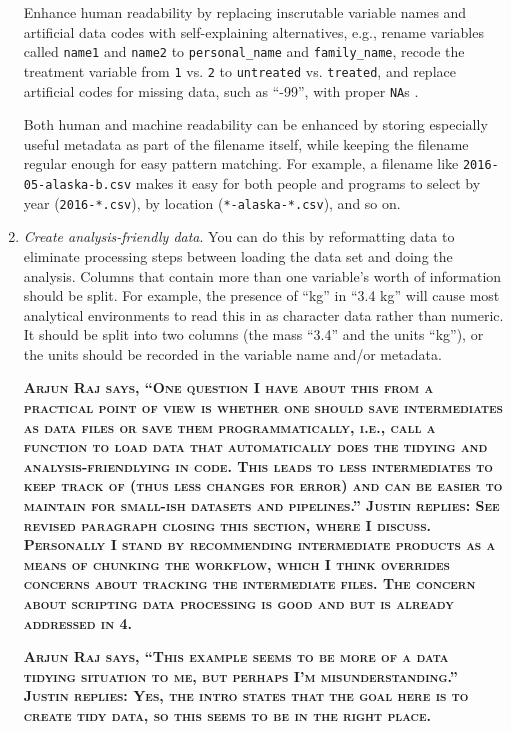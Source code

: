 \documentclass[10pt]{article}
\newcommand{\fixme}[1]{\textsc{\textbf{#1}}}
\newcommand{\recommend}[1]{\textit{#1}}
\begin{document}
\begin{enumerate}
  Enhance
  human readability by replacing inscrutable variable names and
  artificial data codes with self-explaining alternatives, e.g.,
  rename variables called \texttt{name1} and \texttt{name2} to
  \texttt{personal\_name} and \texttt{family\_name}, recode the
  treatment variable from \texttt{1} vs.  \texttt{2} to
  \texttt{untreated} vs. \texttt{treated}, and replace artificial
  codes for missing data, such as ``-99'', with proper \texttt{NA}s
  \cite{white2013}.

  Both human and machine readability can be enhanced by storing
  especially useful metadata as part of the filename itself, while
  keeping the filename regular enough for easy pattern matching. For
  example, a filename like \texttt{2016-05-alaska-b.csv} makes it easy
  for both people and programs to select by year
  (\texttt{2016-*.csv}), by location (\texttt{*-alaska-*.csv}), and so
  on.

\item
  \recommend{Create analysis-friendly data}.  You can do this by
  reformatting data to eliminate processing steps between loading the
  data set and doing the analysis.  Columns that contain more than one
  variable's worth of information should be split. For example, the
  presence of ``kg'' in ``3.4 kg'' will cause most analytical
  environments to read this in as character data rather than
  numeric. It should be split into two columns (the mass ``3.4'' and
  the units ``kg''), or the units should be recorded in the variable
  name and/or metadata.

  \fixme{Arjun Raj says, ``One question I have
    about this from a practical point of view is whether one should
    save intermediates as data files or save them programmatically,
    i.e., call a function to load data that automatically does the
    tidying and analysis-friendlying in code. This leads to less
    intermediates to keep track of (thus less changes for error) and
    can be easier to maintain for small-ish datasets and pipelines.'' Justin replies: See revised paragraph closing this section, where I discuss. Personally I stand by recommending intermediate products as a means of chunking the workflow, which I think overrides concerns about tracking the intermediate files. The concern about scripting data processing is good and but is already addressed in 4.}

  \fixme{Arjun Raj says, ``This example seems to be more of a data
    tidying situation to me, but perhaps I'm misunderstanding.'' Justin replies: Yes, the intro states that the goal here is to create tidy data, so this seems to be in the right place.}


\end{enumerate}
\end{document}
